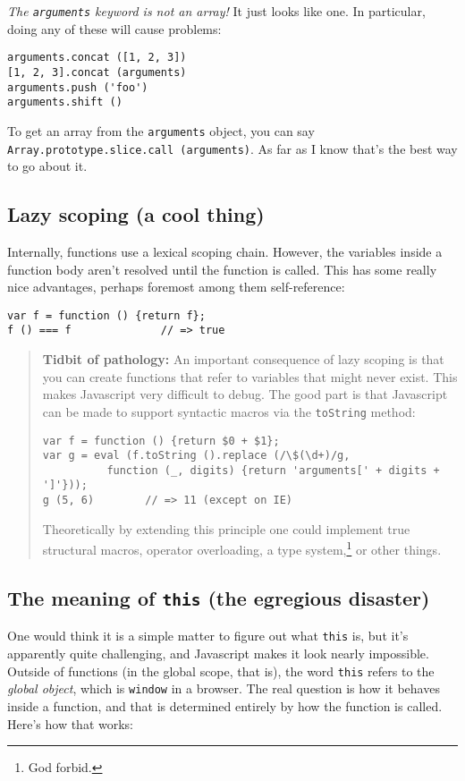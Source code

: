 \documentclass{article}
\begin{document}
    {\it The {\tt arguments} keyword is not an array!} It just looks like one. In particular, doing any of these will cause problems:

\begin{verbatim}
arguments.concat ([1, 2, 3])
[1, 2, 3].concat (arguments)
arguments.push ('foo')
arguments.shift ()
\end{verbatim}

    To get an array from the \verb|arguments| object, you can say \verb|Array.prototype.slice.call (arguments)|. As far as I know that's the best way to go about it.

\subsection {Lazy scoping (a cool thing)}
    Internally, functions use a lexical scoping chain. However, the variables inside a function body aren't resolved until the function is called. This has some really nice advantages,
    perhaps foremost among them self-reference:

\begin{verbatim}
var f = function () {return f};
f () === f              // => true
\end{verbatim}

    \begin{quote}
      {\bf Tidbit of pathology:} An important consequence of lazy scoping is that you can create functions that refer to variables that might never exist. This makes Javascript very difficult
      to debug. The good part is that Javascript can be made to support syntactic macros via the \verb|toString| method:

\begin{verbatim}
var f = function () {return $0 + $1};
var g = eval (f.toString ().replace (/\$(\d+)/g,
          function (_, digits) {return 'arguments[' + digits + ']'}));
g (5, 6)        // => 11 (except on IE)
\end{verbatim}

      Theoretically by extending this principle one could implement true structural macros, operator overloading, a type system,\footnote{God forbid.} or other things.
    \end{quote}

\subsection {The meaning of {\tt this} (the egregious disaster)}
    One would think it is a simple matter to figure out what \verb|this| is, but it's apparently quite challenging, and Javascript makes it look nearly impossible. Outside of functions (in
    the global scope, that is), the word \verb|this| refers to the {\it global object}, which is \verb|window| in a browser. The real question is how it behaves inside a function, and that
    is determined entirely by how the function is called. Here's how that works:
    
\end{document}
